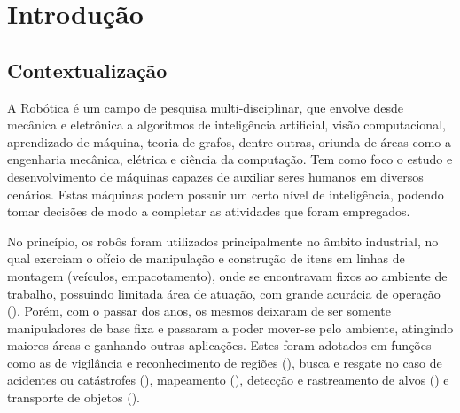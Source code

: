 \chapter{Introdução} %
\label{cha:introdu_o}

\section{Contextualização} %
\label{sec:contextualiza_o}

A Robótica é um campo de pesquisa multi-disciplinar, que envolve desde mecânica e eletrônica a algoritmos de inteligência artificial, visão computacional, aprendizado de máquina, teoria de grafos, dentre outras, oriunda de áreas como a engenharia mecânica, elétrica e ciência da computação.
Tem como foco o estudo e desenvolvimento de máquinas capazes de auxiliar seres humanos em diversos cenários.
Estas máquinas podem possuir um certo nível de inteligência, podendo tomar decisões de modo a completar as atividades que foram empregados.


No princípio, os robôs foram utilizados principalmente no âmbito industrial, no qual exerciam o ofício de manipulação e construção de itens em linhas de montagem (veículos, empacotamento), onde se encontravam fixos ao ambiente de trabalho, possuindo limitada área de atuação, com grande acurácia de operação (\cite{Rol2011}).
Porém, com o passar dos anos, os mesmos deixaram de ser somente manipuladores de base fixa e passaram a poder mover-se pelo ambiente, atingindo maiores áreas e ganhando outras aplicações.
Estes foram adotados em funções como as de vigilância e reconhecimento de regiões (\cite{Tanner2007, Sujit2013}), busca e resgate no caso de acidentes ou catástrofes (\cite{Casper2003, Murphy2004}), mapeamento (\cite{Tokekar2013}), detecção e rastreamento de alvos (\cite{Grocholsky2006}) e transporte de objetos (\cite{Michael2011, Fink2008}).


